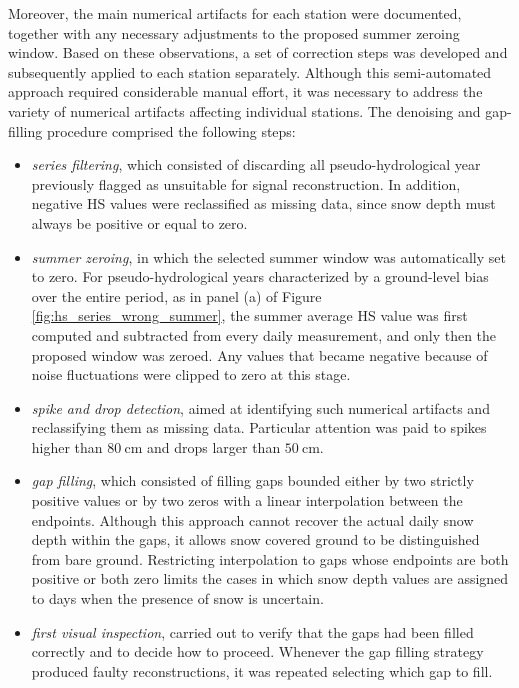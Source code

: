 Moreover, the main numerical artifacts for each station were documented, together with any necessary adjustments to the proposed summer zeroing window. 
Based on these observations, a set of correction steps was developed and subsequently applied to each station separately. Although this semi-automated 
approach required considerable manual effort, it was necessary to address the variety of numerical artifacts affecting individual stations. The denoising 
and gap-filling procedure comprised the following steps:
\begin{itemize}[label=$\blacktriangleright$]
    \item \textit{series filtering}, which consisted of discarding all pseudo-hydrological year previously flagged as unsuitable for signal 
    reconstruction. In addition, negative HS values were reclassified as missing data, since snow depth must always be positive or equal to zero.
    \item \textit{summer zeroing}, in which the selected summer window was automatically set to zero. For pseudo-hydrological years characterized 
    by a ground-level bias over the entire period, as in panel (a) of Figure \ref{fig:hs_series_wrong_summer}, the summer average HS value was first 
    computed and subtracted from every daily measurement, and only then the proposed window was zeroed. Any values that became negative because of 
    noise fluctuations were clipped to zero at this stage.
    \item \textit{spike and drop detection}, aimed at identifying such numerical artifacts and reclassifying them as missing data. Particular 
    attention was paid to spikes higher than $\SI{80}{\centi\meter}$ and drops larger than $\SI{50}{\centi\meter}$.
    \item \textit{gap filling}, which consisted of filling gaps bounded either by two strictly positive values or by two zeros with a linear interpolation 
    between the endpoints. Although this approach cannot recover the actual daily snow depth within the gaps, it allows snow covered ground to be 
    distinguished from bare ground. Restricting interpolation to gaps whose endpoints are both positive or both zero limits the cases in which snow depth 
    values are assigned to days when the presence of snow is uncertain.
    \item \textit{first visual inspection}, carried out to verify that the gaps had been filled correctly and to decide how to proceed. Whenever the 
    gap filling strategy produced faulty reconstructions, it was repeated selecting which gap to fill. 

\end{itemize}
